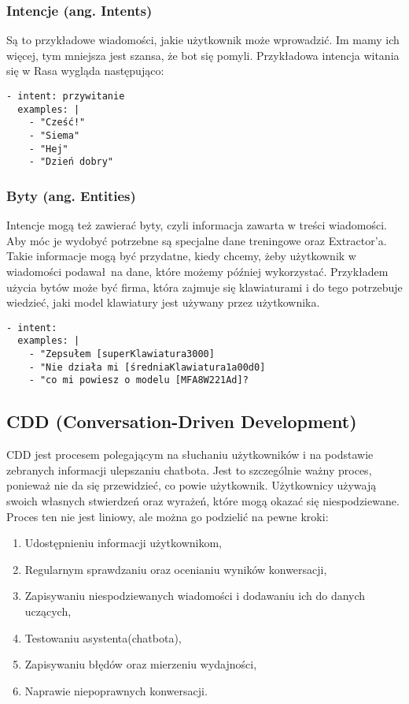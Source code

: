 \documentclass{article}
\begin{document}
\subsubsection{Intencje (ang. Intents)}
Są to przykładowe wiadomości, jakie użytkownik może wprowadzić. Im mamy ich
więcej, tym mniejsza jest szansa, że bot się pomyli. Przykładowa intencja
witania się w Rasa wygląda następująco:

\begin{lstlisting}[caption=Przykładowa intencja]
- intent: przywitanie
  examples: |
    - "Cześć!"
    - "Siema"
    - "Hej"
    - "Dzień dobry"
\end{lstlisting}

\subsubsection{Byty (ang. Entities)}
Intencje mogą też zawierać byty, czyli informacja zawarta w treści wiadomości.
Aby móc je wydobyć potrzebne są specjalne dane treningowe oraz Extractor'a.
Takie informacje mogą być przydatne, kiedy chcemy, żeby użytkownik w wiadomości
podawał na dane, które możemy później wykorzystać. Przykładem użycia bytów może
być firma, która zajmuje się klawiaturami i do tego potrzebuje wiedzieć, jaki
model klawiatury jest używany przez użytkownika.

\begin{lstlisting}[caption=Przykładowa intencja z użyciem bytów]
- intent: 
  examples: |
    - "Zepsułem [superKlawiatura3000]
    - "Nie działa mi [średniaKlawiatura1a00d0]
    - "co mi powiesz o modelu [MFA8W221Ad]?
\end{lstlisting}

\subsection{CDD (Conversation-Driven Development)}
CDD jest procesem polegającym na słuchaniu użytkowników i na podstawie
zebranych informacji ulepszaniu chatbota. Jest to szczególnie ważny proces,
ponieważ nie da się przewidzieć, co powie użytkownik. Użytkownicy używają
swoich własnych stwierdzeń oraz wyrażeń, które mogą okazać się niespodziewane.
Proces ten nie jest liniowy, ale można go podzielić na pewne kroki:
\begin{enumerate}
    \item[\textcolor{violet}{\textbullet}] Udostępnieniu informacji użytkownikom,
    \item[\textcolor{violet}{\textbullet}] Regularnym sprawdzaniu oraz ocenianiu wyników konwersacji,
    \item[\textcolor{violet}{\textbullet}] Zapisywaniu niespodziewanych wiadomości i dodawaniu ich do danych
    uczących,
    \item[\textcolor{violet}{\textbullet}] Testowaniu asystenta(chatbota),
    \item[\textcolor{violet}{\textbullet}] Zapisywaniu błędów oraz mierzeniu wydajności,
    \item[\textcolor{violet}{\textbullet}] Naprawie niepoprawnych konwersacji.
\end{enumerate}
\end{document}
